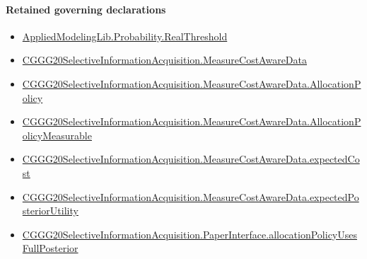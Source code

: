 \documentclass[10pt]{article}
\begin{document}
\paragraph{Retained governing declarations}
\begin{itemize}\raggedright
\item \hyperlink{governing-declaration-41082d9d716d6171}{Applied\allowbreak{}Modeling\allowbreak{}Lib.\allowbreak{}Probability.\allowbreak{}Real\allowbreak{}Threshold}
\item \hyperlink{governing-declaration-254893ae2d19bfc7}{CGGG20\allowbreak{}Selective\allowbreak{}Information\allowbreak{}Acquisition.\allowbreak{}Measure\allowbreak{}Cost\allowbreak{}Aware\allowbreak{}Data}
\item \hyperlink{governing-declaration-f684b24938cfe4a1}{CGGG20\allowbreak{}Selective\allowbreak{}Information\allowbreak{}Acquisition.\allowbreak{}Measure\allowbreak{}Cost\allowbreak{}Aware\allowbreak{}Data.\allowbreak{}Allocation\allowbreak{}Policy}
\item \hyperlink{governing-declaration-a608025aa9e2be3e}{CGGG20\allowbreak{}Selective\allowbreak{}Information\allowbreak{}Acquisition.\allowbreak{}Measure\allowbreak{}Cost\allowbreak{}Aware\allowbreak{}Data.\allowbreak{}Allocation\allowbreak{}Policy\allowbreak{}Measurable}
\item \hyperlink{governing-declaration-d56d09cb698190cc}{CGGG20\allowbreak{}Selective\allowbreak{}Information\allowbreak{}Acquisition.\allowbreak{}Measure\allowbreak{}Cost\allowbreak{}Aware\allowbreak{}Data.\allowbreak{}expected\allowbreak{}Cost}
\item \hyperlink{governing-declaration-61e83f902a85d18e}{CGGG20\allowbreak{}Selective\allowbreak{}Information\allowbreak{}Acquisition.\allowbreak{}Measure\allowbreak{}Cost\allowbreak{}Aware\allowbreak{}Data.\allowbreak{}expected\allowbreak{}Posterior\allowbreak{}Utility}
\item \hyperlink{governing-declaration-8b415bce6ab711e0}{CGGG20\allowbreak{}Selective\allowbreak{}Information\allowbreak{}Acquisition.\allowbreak{}Paper\allowbreak{}Interface.\allowbreak{}allocation\allowbreak{}Policy\allowbreak{}Uses\allowbreak{}Full\allowbreak{}Posterior}
\end{itemize}
\end{document}
